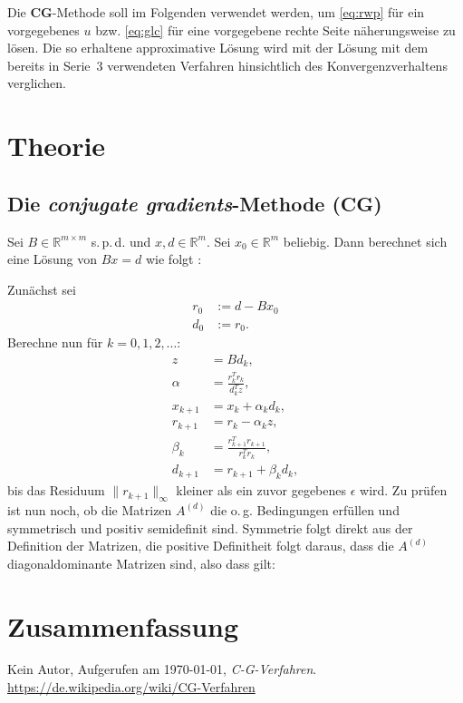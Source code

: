 \documentclass[smallheadings]{scrartcl}
\numberwithin{equation}{section}
\begin{document}
Die \textbf{CG}-Methode soll im Folgenden verwendet werden, um \eqref{eq:rwp} für ein vorgegebenes $u$ bzw. \eqref{eq:glc} für eine vorgegebene rechte Seite näherungsweise zu lösen. Die so erhaltene approximative Lösung wird mit der Lösung mit dem bereits in Serie~3 verwendeten Verfahren hinsichtlich des Konvergenzverhaltens verglichen. 

\section{Theorie}

\subsection{Die \emph{conjugate gradients}-Methode (\textbf{CG})}

Sei $B \in \mathbb{R}^{m\times m}$ s.\,p.\,d. und $x,d\in \mathbb{R}^m$. Sei $x_0\in \mathbb{R}^m$ beliebig. Dann berechnet sich eine Lösung von $Bx=d$ wie folgt \cite{wiki:cg}:


Zunächst sei 
\begin{align}
r_0&:=d-Bx_0\\
d_0&:=r_0.
\end{align}
Berechne nun für $k=0,1,2,\dots$:
\begin{align}
z&=Bd_k,\\
\alpha&=\frac{r_k^Tr_k}{d_k^Tz},\\
x_{k+1}&=x_k+\alpha_kd_k,\\
r_{k+1}&=r_k-\alpha_kz,\\
\beta_k&=\frac{r^T_{k+1}r_{k+1}}{r^T_{k}r_{k}},\\
d_{k+1}&=r_{k+1}+\beta_kd_k,
\end{align}
bis das Residuum $\|r_{k+1}\|_\infty$ kleiner als ein zuvor gegebenes $\epsilon$ wird.
Zu prüfen ist nun noch, ob die Matrizen $A^{(d)}$ die o.\,g. Bedingungen erfüllen und symmetrisch und positiv semidefinit sind. Symmetrie folgt direkt aus der Definition der Matrizen, die positive Definitheit folgt daraus, dass die $A^{(d)}$ diagonaldominante Matrizen sind, also dass gilt:




\section{Zusammenfassung}


\begin{thebibliography}{9}
 Kein Autor, Aufgerufen am \today, \textit{C-G-Verfahren}. 
\url{https://de.wikipedia.org/wiki/CG-Verfahren}
\end{thebibliography}


\end{document}
